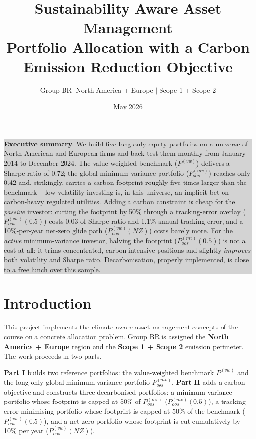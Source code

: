 \documentclass[11pt,a4paper]{article}
\title{\vspace{-1.2cm}\Large\bfseries Sustainability Aware Asset Management\\[2pt]
\large Portfolio Allocation with a Carbon Emission Reduction Objective}
\author{\normalsize Group BR \quad$\vert$\quad North America + Europe \quad$\vert$\quad
Scope 1 + Scope 2}
\date{\normalsize May 2026}
\newcommand{\pmv}{$P^{(mv)}_{oos}$}
\newcommand{\pvw}{$P^{(vw)}$}
\newcommand{\pmvh}{$P^{(mv)}_{oos}(0.5)$}
\newcommand{\pvwh}{$P^{(vw)}_{oos}(0.5)$}
\newcommand{\pnz}{$P^{(vw)}_{oos}(NZ)$}
\begin{document}
\maketitle
\thispagestyle{fancy}
\vspace{-0.7cm}

\begin{center}
\colorbox{lightgray}{%
\begin{minipage}{0.96\textwidth}
\vspace{4pt}
\textbf{Executive summary.} We build five long-only equity portfolios on a
universe of North American and European firms and back-test them monthly from
January 2014 to December 2024. The value-weighted benchmark (\pvw) delivers a
Sharpe ratio of 0.72; the global minimum-variance portfolio (\pmv) reaches only
0.42 and, strikingly, carries a carbon footprint roughly five times larger than
the benchmark -- low-volatility investing is, in this universe, an implicit bet
on carbon-heavy regulated utilities. Adding a carbon constraint is cheap for the
\emph{passive} investor: cutting the footprint by 50\% through a tracking-error
overlay (\pvwh) costs 0.03 of Sharpe ratio and 1.1\% annual tracking
error, and a 10\%-per-year net-zero glide path (\pnz) costs barely more. For the
\emph{active} minimum-variance investor, halving the footprint (\pmvh) is not a
cost at all: it trims concentrated, carbon-intensive positions and slightly
\emph{improves} both volatility and Sharpe ratio. Decarbonisation, properly
implemented, is close to a free lunch over this sample.
\vspace{4pt}
\end{minipage}}
\end{center}

\vspace{0.2cm}

\section{Introduction}

This project implements the climate-aware asset-management concepts of the
course on a concrete allocation problem. Group BR is assigned the
\textbf{North America + Europe} region and the \textbf{Scope 1 + Scope 2}
emission perimeter. The work proceeds in two parts.

\textbf{Part I} builds two reference portfolios: the value-weighted benchmark
\pvw{} and the long-only global minimum-variance portfolio \pmv. \textbf{Part II}
adds a carbon objective and constructs three decarbonised portfolios: a
minimum-variance portfolio whose footprint is capped at 50\% of \pmv{}
(\pmvh), a tracking-error-minimising portfolio whose footprint is capped at
50\% of the benchmark (\pvwh), and a net-zero portfolio whose footprint is cut
cumulatively by 10\% per year (\pnz).
\end{document}
